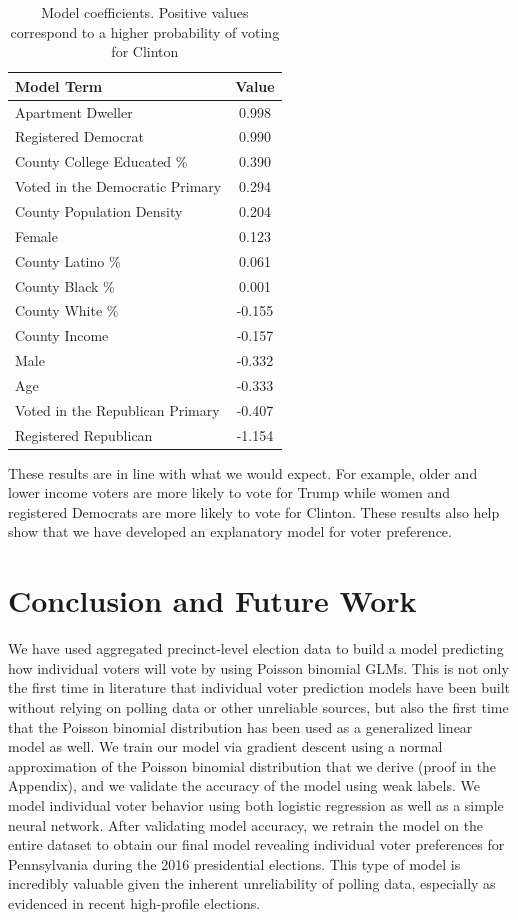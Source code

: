 \documentclass[10pt,twocolumn,letterpaper]{article}
\begin{document}
\begin{table}[H]
\centering
\begin{tabular}{|l|c|}
\hline
Model Term & Value \\
\hline 
Apartment Dweller & 0.998  \\
Registered Democrat & 0.990  \\
County College Educated \% & 0.390  \\
Voted in the Democratic Primary & 0.294  \\
County Population Density & 0.204  \\
Female & 0.123  \\
County Latino \% & 0.061  \\
County Black \% & 0.001  \\
County White \% & -0.155  \\
County Income & -0.157  \\
Male & -0.332  \\
Age & -0.333  \\
Voted in the Republican Primary & -0.407  \\
Registered Republican & -1.154  \\
\hline
\end{tabular}
\label{table:coeff}
\caption{Model coefficients. Positive values correspond to a higher probability of voting for Clinton}
\end{table}

These results are in line with what we would expect. For example, older and lower income voters are more likely to vote for Trump while women and registered Democrats are more likely to vote for Clinton. These results also help show that we have developed an explanatory model for voter preference. 

\section{Conclusion and Future Work}

We have used aggregated precinct-level election data to build a model predicting how individual voters will vote by using Poisson binomial GLMs. This is not only the first time in literature that individual voter prediction models have been built without relying on polling data or other unreliable sources, but also the first time that the Poisson binomial distribution has been used as a generalized linear model as well. We train our model via gradient descent using a normal approximation of the Poisson binomial distribution that we derive (proof in the Appendix), and we validate the accuracy of the model using weak labels. We model individual voter behavior using both logistic regression as well as a simple neural network. After validating model accuracy, we retrain the model on the entire dataset to obtain our final model revealing individual voter preferences for Pennsylvania during the 2016 presidential elections. This type of model is incredibly valuable given the inherent unreliability of polling data, especially as evidenced in recent high-profile elections.
\end{document}
